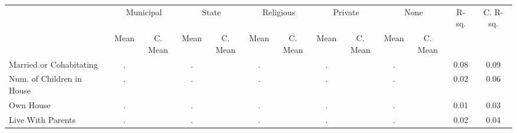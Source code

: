 \begin{tabular}{l c c c c c c c c c c c c}
\toprule
& \multicolumn{2}{c}{Municipal} & \multicolumn{2}{c}{State} & \multicolumn{2}{c}{Religious} & \multicolumn{2}{c}{Private} & \multicolumn{2}{c}{None} & R-sq. & C. R-sq. \\
& \scriptsize Mean & \scriptsize C. Mean & \scriptsize Mean & \scriptsize C. Mean & \scriptsize Mean & \scriptsize C. Mean & \scriptsize Mean & \scriptsize C. Mean & \scriptsize Mean & \scriptsize C. Mean & & \\
\midrule
Married or Cohabitating &         . & &         . & &         . & &         . & &         . & &      0.08 &      0.09 \\
Num. of Children in House &         . & &         . & &         . & &         . & &         . & &      0.02 &      0.06 \\
Own House &         . & &         . & &         . & &         . & &         . & &      0.01 &      0.03 \\
Live With Parents &         . & &         . & &         . & &         . & &         . & &      0.02 &      0.04 \\
\bottomrule
\end{tabular}
